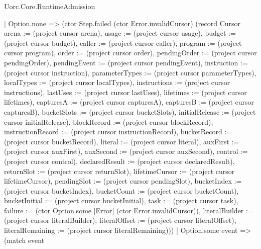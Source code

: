 \begin{lexlean}{Uorc.Core.RuntimeAdmission}
\begin{semanticmodule}
{        | Option.none => (ctor Step.failed (ctor Error.invalidCursor) (record Cursor {arena := (project cursor arena), usage := (project cursor usage), budget := (project cursor budget), caller := (project cursor caller), program := (project cursor program), order := (project cursor order), pendingOrder := (project cursor pendingOrder), pendingEvent := (project cursor pendingEvent), instruction := (project cursor instruction), parameterTypes := (project cursor parameterTypes), localTypes := (project cursor localTypes), instructions := (project cursor instructions), lastUses := (project cursor lastUses), lifetimes := (project cursor lifetimes), capturesA := (project cursor capturesA), capturesB := (project cursor capturesB), bucketSlots := (project cursor bucketSlots), initialRelease := (project cursor initialRelease), blockRecord := (project cursor blockRecord), instructionRecord := (project cursor instructionRecord), bucketRecord := (project cursor bucketRecord), literal := (project cursor literal), auxFirst := (project cursor auxFirst), auxSecond := (project cursor auxSecond), control := (project cursor control), declaredResult := (project cursor declaredResult), returnSlot := (project cursor returnSlot), lifetimeCursor := (project cursor lifetimeCursor), pendingSlot := (project cursor pendingSlot), bucketIndex := (project cursor bucketIndex), bucketCount := (project cursor bucketCount), bucketInitial := (project cursor bucketInitial), task := (project cursor task), failure := (ctor Option.some [Error] (ctor Error.invalidCursor)), literalBuilder := (project cursor literalBuilder), literalOffset := (project cursor literalOffset), literalRemaining := (project cursor literalRemaining)}))
        | Option.some event => (match event
}
\end{semanticmodule}
\end{lexlean}
